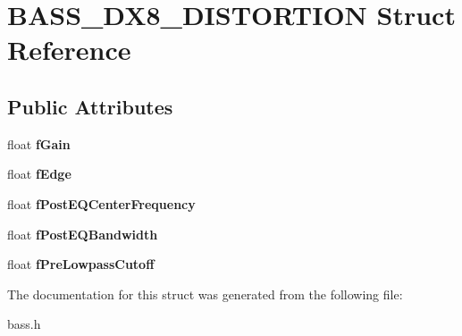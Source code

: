 \hypertarget{structBASS__DX8__DISTORTION}{}\section{B\+A\+S\+S\+\_\+\+D\+X8\+\_\+\+D\+I\+S\+T\+O\+R\+T\+I\+O\+N Struct Reference}
\label{structBASS__DX8__DISTORTION}
\subsection*{Public Attributes}
\begin{DoxyCompactItemize}
\item 
\hypertarget{structBASS__DX8__DISTORTION_aae2a552fff6dec886b79c64c3c985890}{}float {\bfseries f\+Gain}\label{structBASS__DX8__DISTORTION_aae2a552fff6dec886b79c64c3c985890}

\item 
\hypertarget{structBASS__DX8__DISTORTION_a277a36a502bed47facd8be9fe06cfb0e}{}float {\bfseries f\+Edge}\label{structBASS__DX8__DISTORTION_a277a36a502bed47facd8be9fe06cfb0e}

\item 
\hypertarget{structBASS__DX8__DISTORTION_a90e66d9e0cfc132efa0e68429c5cf81d}{}float {\bfseries f\+Post\+E\+Q\+Center\+Frequency}\label{structBASS__DX8__DISTORTION_a90e66d9e0cfc132efa0e68429c5cf81d}

\item 
\hypertarget{structBASS__DX8__DISTORTION_a0825b5f7724ac6c4c9de9d71c4a48d0b}{}float {\bfseries f\+Post\+E\+Q\+Bandwidth}\label{structBASS__DX8__DISTORTION_a0825b5f7724ac6c4c9de9d71c4a48d0b}

\item 
\hypertarget{structBASS__DX8__DISTORTION_a1397454ba65a389b7b2a41bb93d10290}{}float {\bfseries f\+Pre\+Lowpass\+Cutoff}\label{structBASS__DX8__DISTORTION_a1397454ba65a389b7b2a41bb93d10290}

\end{DoxyCompactItemize}


The documentation for this struct was generated from the following file\+:\begin{DoxyCompactItemize}
\item 
bass.\+h\end{DoxyCompactItemize}
